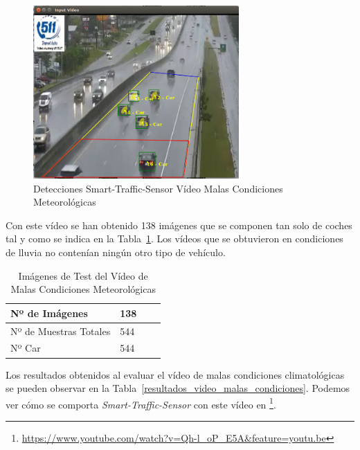 \begin{figure}[H] 
\begin{center}
	\includegraphics[width=0.7\textwidth]{figures/Experimentos/sts_malas_condiciones.png}
   \caption{Detecciones Smart-Traffic-Sensor Vídeo Malas Condiciones Meteorológicas}
	\label{fig.video_malas_condiciones}
\end{center}
\end{figure}

Con este vídeo se han obtenido 138 imágenes que se componen tan solo de coches tal y como se indica en la Tabla~\ref{tabla_video_malas_condiciones}. Los vídeos que se obtuvieron en condiciones de lluvia no contenían ningún otro tipo de vehículo.

\begin{table}[H] 
\begin{center}
\begin{tabular}{|l|l|l|l|}
\hline
Nº de Imágenes  & 138 \\
\hline \hline
Nº de Muestras Totales & 544\\ \hline
Nº Car & 544 \\ \hline
\end{tabular}
\caption{Imágenes de Test del Vídeo de Malas Condiciones Meteorológicas}
\label{tabla_video_malas_condiciones}
\end{center}
\end{table}

Los resultados obtenidos al evaluar el vídeo de malas condiciones climatológicas se pueden observar en la Tabla~\ref{resultados_video_malas_condiciones}. Podemos ver cómo se comporta \textit{Smart-Traffic-Sensor} con este vídeo en \footnote{\url{https://www.youtube.com/watch?v=Qh-l_oP_E5A&feature=youtu.be}}.

